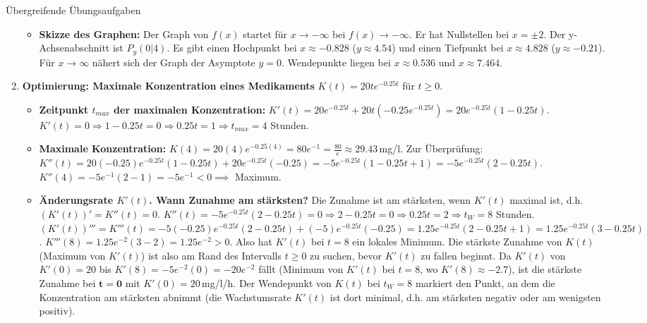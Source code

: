 \begin{loesungsumgebung}{Übergreifende Übungsaufgaben}
\begin{enumerate}
\begin{itemize}
        \item \textbf{Skizze des Graphen:}
        Der Graph von $f(x)$ startet für $x \to -\infty$ bei $f(x) \to -\infty$. Er hat Nullstellen bei $x=\pm 2$. Der y-Achsenabschnitt ist $P_y(0|4)$. Es gibt einen Hochpunkt bei $x \approx -0.828$ ($y \approx 4.54$) und einen Tiefpunkt bei $x \approx 4.828$ ($y \approx -0.21$). Für $x \to \infty$ nähert sich der Graph der Asymptote $y=0$. Wendepunkte liegen bei $x \approx 0.536$ und $x \approx 7.464$.
    \end{itemize}

    \item \textbf{Optimierung: Maximale Konzentration eines Medikaments} $K(t) = 20t e^{-0.25t}$ für $t \ge 0$.
    \begin{itemize}
        \item \textbf{Zeitpunkt $t_{max}$ der maximalen Konzentration:}
        $K'(t) = 20e^{-0.25t} + 20t(-0.25e^{-0.25t}) = 20e^{-0.25t}(1-0.25t)$.
        $K'(t)=0 \Rightarrow 1-0.25t=0 \Rightarrow 0.25t=1 \Rightarrow t_{max}=4$ Stunden.
        \item \textbf{Maximale Konzentration:}
        $K(4) = 20(4)e^{-0.25(4)} = 80e^{-1} = \frac{80}{e} \approx 29.43\,$mg/l.
        Zur Überprüfung: $K''(t) = 20(-0.25)e^{-0.25t}(1-0.25t) + 20e^{-0.25t}(-0.25) = -5e^{-0.25t}(1-0.25t+1) = -5e^{-0.25t}(2-0.25t)$.
        $K''(4) = -5e^{-1}(2-1) = -5e^{-1} < 0 \implies$ Maximum.
        \item \textbf{Änderungsrate $K'(t)$. Wann Zunahme am stärksten?}
        Die Zunahme ist am stärksten, wenn $K'(t)$ maximal ist, d.h. $(K'(t))'=K''(t)=0$.
        $K''(t) = -5e^{-0.25t}(2-0.25t)=0 \Rightarrow 2-0.25t=0 \Rightarrow 0.25t=2 \Rightarrow t_W=8$ Stunden.
        $(K'(t))''' = K'''(t) = -5(-0.25)e^{-0.25t}(2-0.25t) + (-5)e^{-0.25t}(-0.25) = 1.25e^{-0.25t}(2-0.25t+1) = 1.25e^{-0.25t}(3-0.25t)$.
        $K'''(8) = 1.25e^{-2}(3-2) = 1.25e^{-2} > 0$.
        Also hat $K'(t)$ bei $t=8$ ein lokales Minimum. Die stärkste Zunahme von $K(t)$ (Maximum von $K'(t)$) ist also am Rand des Intervalls $t \ge 0$ zu suchen, bevor $K'(t)$ zu fallen beginnt. Da $K'(t)$ von $K'(0)=20$ bis $K'(8)=-5e^{-2}(0)=-20e^{-2}$ fällt (Minimum von $K'(t)$ bei $t=8$, wo $K'(8) \approx -2.7$), ist die stärkste Zunahme bei $\mathbf{t=0}$ mit $K'(0)=20\,$mg/l/h.
        Der Wendepunkt von $K(t)$ bei $t_W=8$ markiert den Punkt, an dem die Konzentration am stärksten abnimmt (die Wachstumsrate $K'(t)$ ist dort minimal, d.h. am stärksten negativ oder am wenigsten positiv).
    \end{itemize}


\end{enumerate}
\end{loesungsumgebung}
